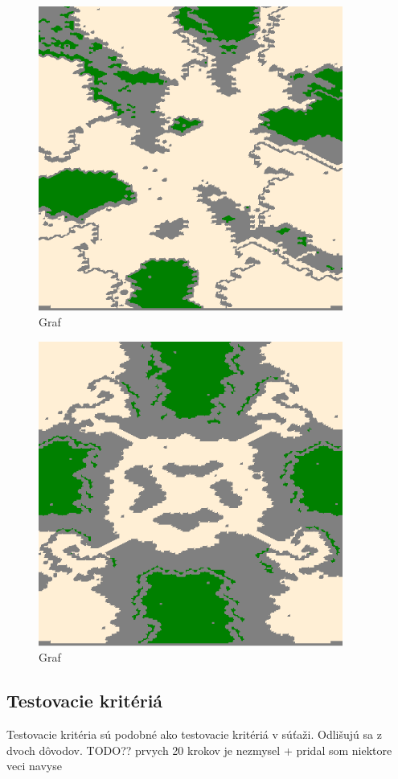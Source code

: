 \begin{figure}[h]
\centering
\includegraphics[width=10cm]{./img/Aftershock.png}
\caption{Graf }
\label{fig:aftershock_map}
\end{figure}
\begin{figure}[h]
\centering
\includegraphics[width=10cm]{./img/Brushfire.png}
\caption{Graf }
\label{fig:brushfire_map}
\end{figure}
\subsection{Testovacie kritériá}
Testovacie kritéria sú podobné ako testovacie kritériá v súťaži. 
Odlišujú sa z dvoch dôvodov. TODO?? prvych 20 krokov je nezmysel + pridal som niektore veci navyse

